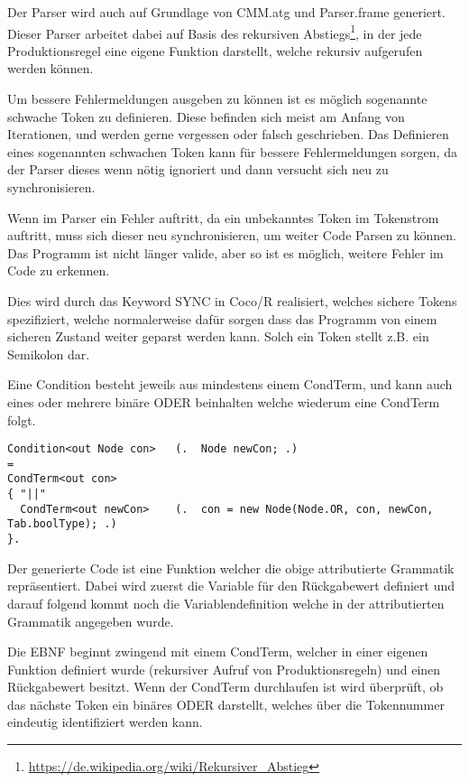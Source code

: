 Der Parser wird auch auf Grundlage von CMM.atg und Parser.frame generiert. Dieser Parser arbeitet dabei auf Basis des rekursiven Abstiegs\footnote{\url{https://de.wikipedia.org/wiki/Rekursiver_Abstieg}}, in der jede Produktionsregel eine eigene Funktion darstellt, welche rekursiv aufgerufen werden k\"onnen.


Um bessere Fehlermeldungen ausgeben zu k\"onnen ist es m\"oglich sogenannte schwache Token zu definieren. Diese befinden sich meist am Anfang von Iterationen, und werden gerne vergessen oder falsch geschrieben. Das Definieren eines sogenannten schwachen Token kann f\"ur bessere Fehlermeldungen sorgen, da der Parser dieses wenn n\"otig ignoriert und dann versucht sich neu zu synchronisieren.


Wenn im Parser ein Fehler auftritt, da ein unbekanntes Token im Tokenstrom auftritt, muss sich dieser neu synchronisieren, um weiter Code Parsen zu k\"onnen. Das Programm ist nicht l\"anger valide, aber so ist es m\"oglich, weitere Fehler im Code zu erkennen.

Dies wird durch das Keyword SYNC in Coco/R realisiert, welches sichere Tokens spezifiziert, welche normalerweise daf\"ur sorgen dass das Programm von einem sicheren Zustand weiter geparst werden kann. Solch ein Token stellt z.B. ein Semikolon dar.


Eine Condition besteht jeweils aus mindestens einem CondTerm, und kann auch eines oder mehrere bin\"are ODER beinhalten welche wiederum eine CondTerm folgt.

\begin{lstlisting}[language=EBNF]
Condition<out Node con>   (.  Node newCon; .)
= 
CondTerm<out con>
{ "||"                                
  CondTerm<out newCon>    (.  con = new Node(Node.OR, con, newCon, Tab.boolType); .)
}.
\end{lstlisting}

Der generierte Code ist eine Funktion welcher die obige attributierte Grammatik repr\"asentiert. Dabei wird zuerst die Variable f\"ur den R\"uckgabewert definiert und darauf folgend kommt noch die Variablendefinition welche in der attributierten Grammatik angegeben wurde.

Die EBNF beginnt zwingend mit einem CondTerm, welcher in einer eigenen Funktion definiert wurde (rekursiver Aufruf von Produktionsregeln) und einen R\"uckgabewert besitzt. Wenn der CondTerm durchlaufen ist wird \"uberpr\"uft, ob das n\"achste Token ein bin\"ares ODER darstellt, welches \"uber die Tokennummer eindeutig identifiziert werden kann.

